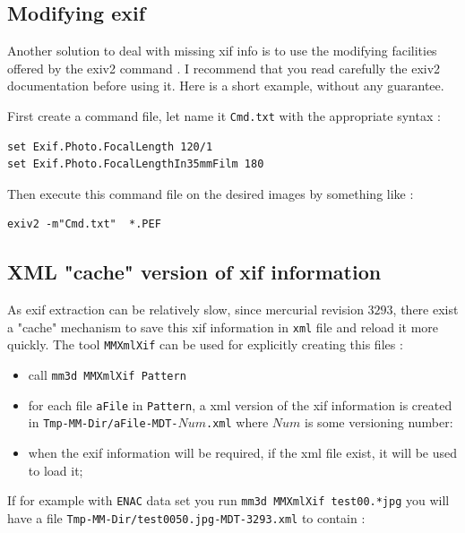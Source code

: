 \subsection{Modifying  exif}

Another solution to deal with missing xif info is to use the 
modifying facilities offered by the  exiv2 command .
I recommend that you read carefully
the exiv2 documentation before using it. Here is a short example,
without  any guarantee.

First create a command file, let name it {\tt Cmd.txt} with the appropriate syntax :

\begin{verbatim}
set Exif.Photo.FocalLength 120/1
set Exif.Photo.FocalLengthIn35mmFilm 180
\end{verbatim}

Then execute this command file on the desired images by something like :

\begin{verbatim}
exiv2 -m"Cmd.txt"  *.PEF
\end{verbatim}



\subsection{XML "cache" version of xif information}

As exif extraction can be relatively slow, since mercurial revision $3293$, there exist a
"cache" mechanism to save this xif information in {\tt xml} file and reload it more quickly.
The tool {\tt MMXmlXif} can be used for explicitly creating this files :

\begin{itemize}
   \item call {\tt mm3d MMXmlXif Pattern} 
   \item  for each file {\tt aFile} in {\tt Pattern}, a xml version of the xif information is created in
          {\tt Tmp-MM-Dir/aFile-MDT-$Num$.xml}  where $Num$ is some versioning number:
    \item when the exif information will be required, if the  xml file exist, it will be used to load it;
\end{itemize}

If for example with {\tt ENAC} data set you run {\tt mm3d MMXmlXif test00.*jpg} 
you will have a file {\tt Tmp-MM-Dir/test0050.jpg-MDT-3293.xml} to contain :

